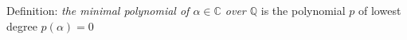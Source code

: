 \documentclass[preview]{standalone}
\begin{document}
\begin{center}
Definition: \textit{the minimal polynomial of $\alpha \in \mathbb{C}$ over $\mathbb{Q}$} is the polynomial $p$ of lowest degree $p(\alpha) = 0$
\end{center}
\end{document}
